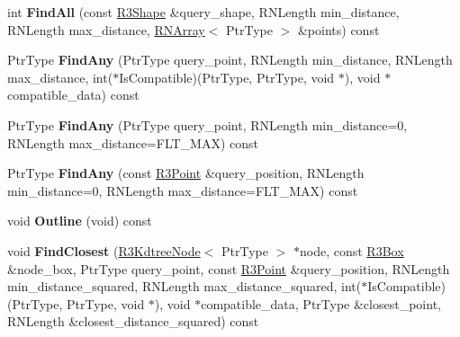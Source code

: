 \begin{DoxyCompactItemize}
\item 
int {\bfseries Find\+All} (const \hyperlink{class_r3_shape}{R3\+Shape} \&query\+\_\+shape, R\+N\+Length min\+\_\+distance, R\+N\+Length max\+\_\+distance, \hyperlink{class_r_n_array}{R\+N\+Array}$<$ Ptr\+Type $>$ \&points) const \hypertarget{class_r3_kdtree_aa012d9833a77f06936c69cd389e20db6}{}\label{class_r3_kdtree_aa012d9833a77f06936c69cd389e20db6}

\item 
Ptr\+Type {\bfseries Find\+Any} (Ptr\+Type query\+\_\+point, R\+N\+Length min\+\_\+distance, R\+N\+Length max\+\_\+distance, int($\ast$Is\+Compatible)(Ptr\+Type, Ptr\+Type, void $\ast$), void $\ast$compatible\+\_\+data) const \hypertarget{class_r3_kdtree_a5cac7e268dc2f7f06d8b1bf5a3a92fee}{}\label{class_r3_kdtree_a5cac7e268dc2f7f06d8b1bf5a3a92fee}

\item 
Ptr\+Type {\bfseries Find\+Any} (Ptr\+Type query\+\_\+point, R\+N\+Length min\+\_\+distance=0, R\+N\+Length max\+\_\+distance=F\+L\+T\+\_\+\+M\+AX) const \hypertarget{class_r3_kdtree_a370311b1f187236395af80ee67f23764}{}\label{class_r3_kdtree_a370311b1f187236395af80ee67f23764}

\item 
Ptr\+Type {\bfseries Find\+Any} (const \hyperlink{class_r3_point}{R3\+Point} \&query\+\_\+position, R\+N\+Length min\+\_\+distance=0, R\+N\+Length max\+\_\+distance=F\+L\+T\+\_\+\+M\+AX) const \hypertarget{class_r3_kdtree_ae842f41eb444501f601f5b0967cf76db}{}\label{class_r3_kdtree_ae842f41eb444501f601f5b0967cf76db}

\item 
void {\bfseries Outline} (void) const \hypertarget{class_r3_kdtree_a3bbb029fbc96ccbe2f0a2310daedd2b1}{}\label{class_r3_kdtree_a3bbb029fbc96ccbe2f0a2310daedd2b1}

\item 
void {\bfseries Find\+Closest} (\hyperlink{class_r3_kdtree_node}{R3\+Kdtree\+Node}$<$ Ptr\+Type $>$ $\ast$node, const \hyperlink{class_r3_box}{R3\+Box} \&node\+\_\+box, Ptr\+Type query\+\_\+point, const \hyperlink{class_r3_point}{R3\+Point} \&query\+\_\+position, R\+N\+Length min\+\_\+distance\+\_\+squared, R\+N\+Length max\+\_\+distance\+\_\+squared, int($\ast$Is\+Compatible)(Ptr\+Type, Ptr\+Type, void $\ast$), void $\ast$compatible\+\_\+data, Ptr\+Type \&closest\+\_\+point, R\+N\+Length \&closest\+\_\+distance\+\_\+squared) const \hypertarget{class_r3_kdtree_ac60eb1582d5f94051ba76991b6095fe6}{}\label{class_r3_kdtree_ac60eb1582d5f94051ba76991b6095fe6}


\end{DoxyCompactItemize}
